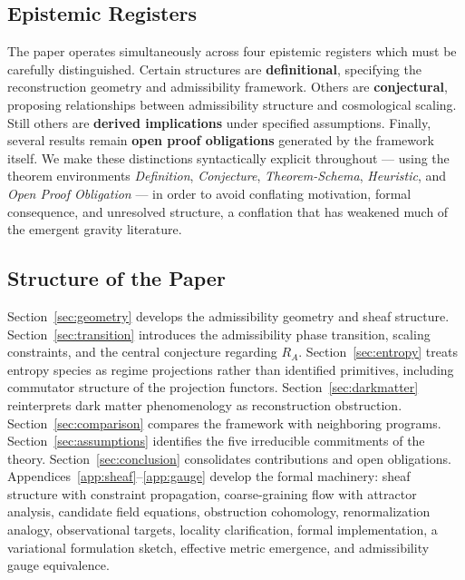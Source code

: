 \documentclass[11pt, a4paper]{article}
\theoremstyle{plain}
\theoremstyle{definition}
\theoremstyle{remark}
\newcommand{\RA}{R_{\!A}}
\begin{document}
\subsection*{Epistemic Registers}

The paper operates simultaneously across four epistemic registers which must be
carefully distinguished. Certain structures are \textbf{definitional}, specifying
the reconstruction geometry and admissibility framework. Others are
\textbf{conjectural}, proposing relationships between admissibility structure and
cosmological scaling. Still others are \textbf{derived implications} under specified
assumptions. Finally, several results remain \textbf{open proof obligations}
generated by the framework itself. We make these distinctions syntactically explicit
throughout --- using the theorem environments \emph{Definition}, \emph{Conjecture},
\emph{Theorem-Schema}, \emph{Heuristic}, and \emph{Open Proof Obligation} --- in
order to avoid conflating motivation, formal consequence, and unresolved structure, a
conflation that has weakened much of the emergent gravity literature.

\subsection*{Structure of the Paper}

Section~\ref{sec:geometry} develops the admissibility geometry and sheaf structure.
Section~\ref{sec:transition} introduces the admissibility phase transition, scaling
constraints, and the central conjecture regarding $\RA$.
Section~\ref{sec:entropy} treats entropy species as regime projections rather than
identified primitives, including commutator structure of the projection functors.
Section~\ref{sec:darkmatter} reinterprets dark matter phenomenology as reconstruction
obstruction. Section~\ref{sec:comparison} compares the framework with neighboring
programs. Section~\ref{sec:assumptions} identifies the five irreducible commitments
of the theory. Section~\ref{sec:conclusion} consolidates contributions and open
obligations. Appendices~\ref{app:sheaf}--\ref{app:gauge} develop the formal
machinery: sheaf structure with constraint propagation, coarse-graining flow with
attractor analysis, candidate field equations, obstruction cohomology, renormalization
analogy, observational targets, locality clarification, formal implementation, a
variational formulation sketch, effective metric emergence, and admissibility gauge
equivalence.

\end{document}
